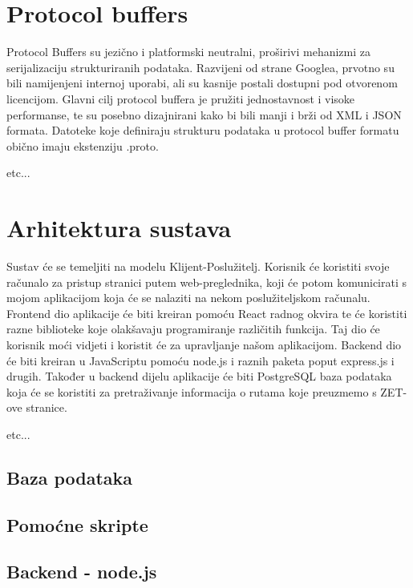 \documentclass[zavrsnirad]{fer}
\begin{document}
\newpage
\section[Protobuf]{Protocol buffers}
\label{sec:protobuf}

Protocol Buffers su jezično i platformski neutralni, proširivi mehanizmi za serijalizaciju
strukturiranih podataka. Razvijeni od strane Googlea, prvotno su bili namijenjeni internoj uporabi,
ali su kasnije postali dostupni pod otvorenom licencijom. Glavni cilj protocol buffera je pružiti
jednostavnost i visoke performanse, te su posebno dizajnirani kako bi bili manji i brži od XML i
JSON formata. Datoteke koje definiraju strukturu podataka u protocol buffer formatu obično imaju
ekstenziju .proto.

etc...

\section{Arhitektura sustava}

Sustav će se temeljiti na modelu Klijent-Poslužitelj. Korisnik će koristiti svoje računalo za pristup
stranici putem web-preglednika, koji će potom komunicirati s mojom aplikacijom koja će se nalaziti
na nekom poslužiteljskom računalu. Frontend dio aplikacije će biti kreiran pomoću React radnog
okvira te će koristiti razne biblioteke koje olakšavaju programiranje različitih funkcija. Taj dio će
korisnik moći vidjeti i koristit će za upravljanje našom aplikacijom. Backend dio će biti kreiran u
JavaScriptu pomoću node.js i raznih paketa poput express.js i drugih. Također u backend dijelu
aplikacije će biti PostgreSQL baza podataka koja će se koristiti za pretraživanje informacija o
rutama koje preuzmemo s ZET-ove stranice.

etc...

\subsection{Baza podataka}
\label{sec:baza}

\subsection{Pomoćne skripte}

\subsection{Backend - node.js}
\end{document}

